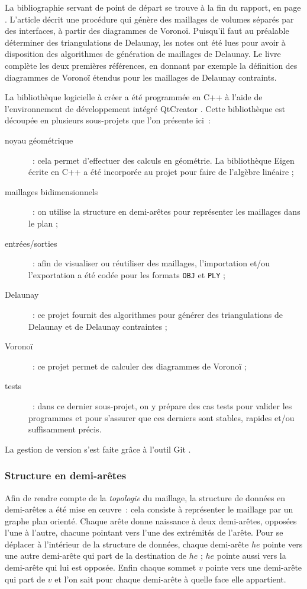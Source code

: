 \documentclass[12pt,a4paper]{report}
\begin{document}
La bibliographie servant de point de départ se trouve à la fin du rapport, en page \pageref{biblio}. L'article \cite{Garimella} décrit une procédure qui génère des maillages de volumes séparés par des interfaces, à partir des diagrammes de Voronoï. Puisqu'il faut au préalable déterminer des triangulations de Delaunay, les notes \cite{delnotes} ont été lues pour avoir à disposition des algorithmes de génération de maillages de Delaunay. Le livre \cite{Edelsbrunner} complète les deux premières références, en donnant par exemple la définition des diagrammes de Voronoï étendus pour les maillages de Delaunay contraints.

La bibliothèque logicielle à créer a été programmée en C++ à l'aide de l'environnement de développement intégré QtCreator \cite{QtCreator}. Cette bibliothèque est découpée en plusieurs sous-projets que l'on présente ici~:
\begin{description}
\item[noyau géométrique]~: cela permet d'effectuer des calculs en géométrie. La bibliothèque Eigen \cite{Eigen} écrite en C++ a été incorporée au projet pour faire de l'algèbre linéaire ;
\item[maillages bidimensionnels]~: on utilise la structure en demi-arêtes pour représenter les maillages dans le plan ;
\item[entrées/sorties]~: afin de visualiser ou réutiliser des maillages, l'importation et/ou l'exportation a été codée pour les formats \verb+OBJ+ et \verb+PLY+ ;
\item[Delaunay]~: ce projet fournit des algorithmes pour générer des triangulations de Delaunay et de Delaunay contraintes ;
\item[Voronoï]~: ce projet permet de calculer des diagrammes de Voronoï ;
\item[tests]~: dans ce dernier sous-projet, on y prépare des cas tests pour valider les programmes et pour s'assurer que ces derniers sont stables, rapides et/ou suffisamment précis.
\end{description}

La gestion de version s'est faite grâce à l'outil Git \cite{Git}.

\subsubsection{Structure en demi-arêtes}

Afin de rendre compte de la \emph{topologie} du maillage, la structure de données en demi-arêtes a été mise en \oe{}uvre~: cela consiste à représenter le maillage par un graphe plan orienté. Chaque arête donne naissance à deux demi-arêtes, opposées l'une à l'autre, chacune pointant vers l'une des extrémités de l'arête. Pour se déplacer à l'intérieur de la structure de données, chaque demi-arête $he$ pointe vers une autre demi-arête qui part de la destination de $he$ ; $he$ pointe aussi vers la demi-arête qui lui est opposée. Enfin chaque sommet $v$ pointe vers une demi-arête qui part de $v$ et l'on sait pour chaque demi-arête à quelle face elle appartient.
\end{document}
